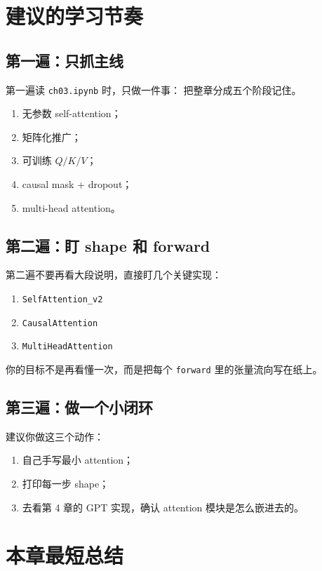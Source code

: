 \documentclass[12pt,a4paper]{ctexart}
\newcommand{\filepath}[1]{\texttt{#1}}
\newcommand{\code}[1]{\texttt{#1}}
\begin{document}
\section{建议的学习节奏}

\subsection{第一遍：只抓主线}

第一遍读 \filepath{ch03.ipynb} 时，只做一件事：
把整章分成五个阶段记住。

\begin{enumerate}
  \item 无参数 self-attention；
  \item 矩阵化推广；
  \item 可训练 \(Q/K/V\)；
  \item causal mask + dropout；
  \item multi-head attention。
\end{enumerate}

\subsection{第二遍：盯 shape 和 forward}

第二遍不要再看大段说明，直接盯几个关键实现：

\begin{enumerate}
  \item \code{SelfAttention\_v2}
  \item \code{CausalAttention}
  \item \code{MultiHeadAttention}
\end{enumerate}

你的目标不是再看懂一次，而是把每个 \code{forward} 里的张量流向写在纸上。

\subsection{第三遍：做一个小闭环}

建议你做这三个动作：

\begin{enumerate}
  \item 自己手写最小 attention；
  \item 打印每一步 shape；
  \item 去看第 4 章的 GPT 实现，确认 attention 模块是怎么嵌进去的。
\end{enumerate}

\section{本章最短总结}
\end{document}
